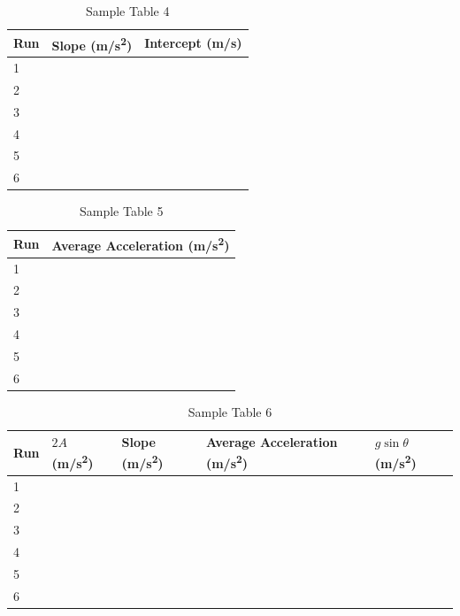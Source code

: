 %
\newpage
\begin{table}[ht!]
    \begin{center}
        \begin{tabular}{l | l | l}
            \textbf{Run} & \textbf{Slope} (m/s\textsuperscript{2}) & \textbf{Intercept} (m/s) \\
            \hline
            1 & & \\
            2 & & \\
            3 & & \\
            \hline
            4 & & \\
            5 & & \\
            6 & & \\
            \hline
        \end{tabular}
    \end{center}
    \caption{Sample Table 4}
\end{table}
%
\begin{table}[ht!]
    \begin{center}
        \begin{tabular}{l | l}
            \textbf{Run} & \textbf{Average Acceleration} (m/s\textsuperscript{2}) \\
            \hline
            1 & \\
            2 & \\
            3 & \\
            \hline
            4 & \\
            5 & \\
            6 & \\
            \hline
        \end{tabular}
    \end{center}
    \caption{Sample Table 5}
\end{table}
%
\begin{table}[ht!]
    \begin{center}
        \begin{tabular}{l | l | l | l | l}
            \textbf{Run} & $2A$ (m/s\textsuperscript{2}) & \textbf{Slope} (m/s\textsuperscript{2}) & \textbf{Average Acceleration} (m/s\textsuperscript{2}) & $g \sin \theta$ (m/s\textsuperscript{2}) \\
            \hline
            1 & & & & \\
            2 & & & & \\
            3 & & & & \\
            \hline
            4 & & & & \\
            5 & & & & \\
            6 & & & & \\
            \hline
        \end{tabular}
        \caption{Sample Table 6}
    \end{center}
\end{table}
